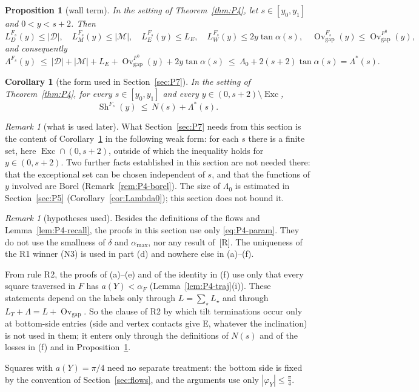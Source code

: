 \documentclass[11pt]{amsart}
\newcommand{\cD}{\mathcal D}
\newcommand{\cM}{\mathcal M}
\newcommand{\Sh}{\operatorname{Sh}}
\newcommand{\Ovgap}{\operatorname{Ov}_{\mathrm{gap}}}
\newcommand{\Exc}{\operatorname{Exc}}
\newcommand{\amax}{\alpha_{\max}}
\newcommand{\Lam}{\Lambda}
\newcommand{\Fz}{F^{0}}
\newcommand{\Fs}{F_{s}}
\newtheorem{proposition}[theorem]{Proposition}
\newtheorem{corollary}[theorem]{Corollary}
\theoremstyle{definition}
\theoremstyle{remark}
\newtheorem{remark}[theorem]{Remark}
\numberwithin{equation}{section}
\begin{document}
\begin{proposition}[wall term]\label{prop:wall}
In the setting of Theorem~\ref{thm:P4}, let $s\in[y_0,y_1]$ and $0<y<s+2$. Then
\[
L^{\Fs}_D(y)\le|\cD|,\quad L^{\Fs}_M(y)\le|\cM|,\quad L^{\Fs}_E(y)\le L_E,\quad L^{\Fs}_W(y)\le2y\tan\alpha(s),\quad \Ovgap^{\Fs}(y)\le\Ovgap^{\Fz}(y),
\]
and consequently
\[
\Lam^{\Fs}(y)\ \le\ |\cD|+|\cM|+L_E+\Ovgap^{\Fz}(y)+2y\tan\alpha(s)\ \le\ \Lam_0+2(s+2)\tan\alpha(s)=\Lam^*(s).
\]
\end{proposition}

\begin{corollary}[the form used in Section~\ref{sec:P7}]\label{cor:P4-scale}
In the setting of Theorem~\ref{thm:P4}, for every $s\in[y_0,y_1]$ and every $y\in(0,s+2)\setminus\Exc$,
\[
\Sh^{\Fs}(y)\ \le\ N(s)+\Lam^*(s).
\]
\end{corollary}

\begin{remark}[what is used later]\label{rem:P4-used}
What Section~\ref{sec:P7} needs from this section is the content of Corollary~\ref{cor:P4-scale} in the following weak form: for each $s$ there is a finite set, here $\Exc\cap(0,s+2)$, outside of which the inequality holds for $y\in(0,s+2)$. Two further facts established in this section are not needed there: that the exceptional set can be chosen independent of $s$, and that the functions of $y$ involved are Borel (Remark~\ref{rem:P4-borel}). The size of $\Lam_0$ is estimated in Section~\ref{sec:P5} (Corollary~\ref{cor:Lambda0}); this section does not bound it.
\end{remark}

\begin{remark}[hypotheses used]\label{rem:P4-hyp}
Besides the definitions of the flows and Lemma~\ref{lem:P4-recall}, the proofs in this section use only \eqref{eq:P4-param}. They do not use the smallness of $\delta$ and $\amax$, nor any result of~[R]. The uniqueness of the R1 winner (N3) is used in part (d) and nowhere else in (a)--(f).

From rule R2, the proofs of (a)--(e) and of the identity in (f) use only that every square traversed in $F$ has $a(Y)<\alpha_F$ (Lemma~\ref{lem:P4-traj}(i)). These statements depend on the labels only through $L=\sum_\star L_\star$ and through $L_T+\Lam=L+\Ovgap$. So the clause of R2 by which tilt terminations occur only at bottom-side entries (side and vertex contacts give E, whatever the inclination) is not used in them; it enters only through the definitions of $N(s)$ and of the losses in (f) and in Proposition~\ref{prop:wall}.

Squares with $a(Y)=\pi/4$ need no separate treatment: the bottom side is fixed by the convention of Section~\ref{sec:flows}, and the arguments use only $|\varphi_Y|\le\frac\pi4$.
\end{remark}
\end{document}
